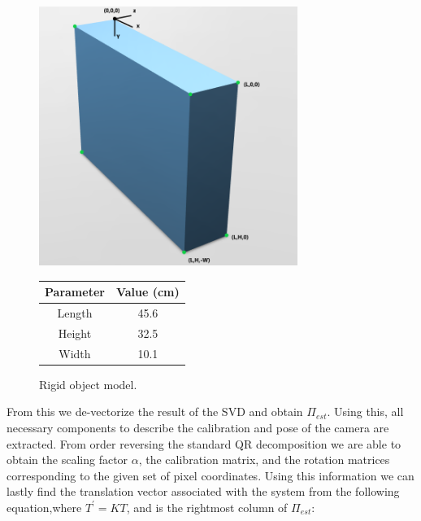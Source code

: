 \documentclass[12pt]{article}
\begin{document}
\begin{figure}[h]
	\centering %
	\captionsetup{justification=centering}
	\begin{minipage}{0.5\textwidth}
		\centering %
		\includegraphics[width=0.75\textwidth]{BoxModel.png}
		\caption{Rigid object model.} \label{box}
	\end{minipage}\hfill
	\begin{minipage}{0.5\textwidth}
		\begin{center}
			\begin{tabular}[5pt]{| c| c|}
				\hline
				Parameter	& Value (cm) \\[0.5ex] 
				\hline 	
				Length& 45.6  \\ \hline 
				Height& 32.5  \\ \hline 
				Width& 10.1  \\ \hline 
			\end{tabular}
			\label{boxdim}
		\end{center}	
	\end{minipage}
\end{figure}

\noindent From this we de-vectorize the result of the SVD and obtain $\Pi_{est}$. Using this, all necessary components to describe the calibration and pose of the camera are extracted. From order reversing the standard QR decomposition we are able to obtain the scaling factor $\alpha$, the calibration matrix, and the rotation matrices corresponding to the given set of pixel coordinates. Using this information we can lastly find the translation vector associated with the system from the following equation,where $T^{'} = KT$, and is the rightmost column of $\Pi_{est}$: \nolinebreak
\end{document}
